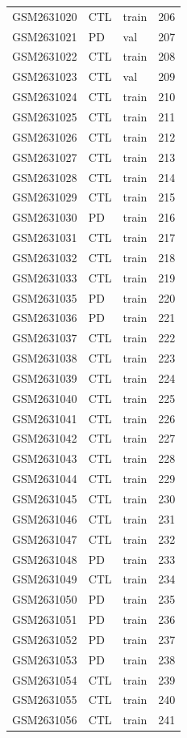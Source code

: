 \begin{footnotesize}
\begin{longtable}{llll}
GSM2631020 & CTL & train & 206 \\
GSM2631021 & PD & val & 207 \\
GSM2631022 & CTL & train & 208 \\
GSM2631023 & CTL & val & 209 \\
GSM2631024 & CTL & train & 210 \\
GSM2631025 & CTL & train & 211 \\
GSM2631026 & CTL & train & 212 \\
GSM2631027 & CTL & train & 213 \\
GSM2631028 & CTL & train & 214 \\
GSM2631029 & CTL & train & 215 \\
GSM2631030 & PD & train & 216 \\
GSM2631031 & CTL & train & 217 \\
GSM2631032 & CTL & train & 218 \\
GSM2631033 & CTL & train & 219 \\
GSM2631035 & PD & train & 220 \\
GSM2631036 & PD & train & 221 \\
GSM2631037 & CTL & train & 222 \\
GSM2631038 & CTL & train & 223 \\
GSM2631039 & CTL & train & 224 \\
GSM2631040 & CTL & train & 225 \\
GSM2631041 & CTL & train & 226 \\
GSM2631042 & CTL & train & 227 \\
GSM2631043 & CTL & train & 228 \\
GSM2631044 & CTL & train & 229 \\
GSM2631045 & CTL & train & 230 \\
GSM2631046 & CTL & train & 231 \\
GSM2631047 & CTL & train & 232 \\
GSM2631048 & PD & train & 233 \\
GSM2631049 & CTL & train & 234 \\
GSM2631050 & PD & train & 235 \\
GSM2631051 & PD & train & 236 \\
GSM2631052 & PD & train & 237 \\
GSM2631053 & PD & train & 238 \\
GSM2631054 & CTL & train & 239 \\
GSM2631055 & CTL & train & 240 \\
GSM2631056 & CTL & train & 241 \\

\end{longtable}
\end{footnotesize}
